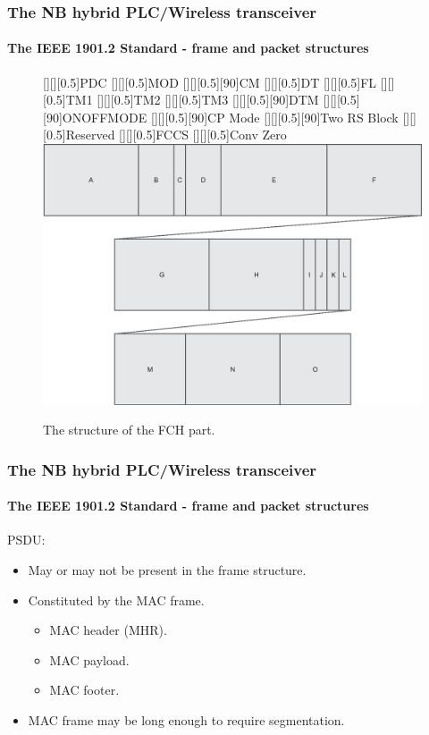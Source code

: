 \documentclass[mathserif]{beamer}
\newcommand{\wait}{\vfill}
\begin{document}
\begin{frame}
	\frametitle{The NB hybrid PLC/Wireless transceiver}
	\framesubtitle{The IEEE 1901.2 Standard - frame and packet structures}
	\renewcommand{\sizeLetter}{0.5}
	\begin{figure}[ht]
		\centering
		[][][\sizeLetter]{PDC}
		[][][\sizeLetter]{MOD}
		[][][\sizeLetter][90]{CM}
		[][][\sizeLetter]{DT}
		[][][\sizeLetter]{FL}
		[][][\sizeLetter]{TM1}
		[][][\sizeLetter]{TM2}
		[][][\sizeLetter]{TM3}
		[][][\sizeLetter][90]{DTM}
		[][][\sizeLetter][90]{ONOFFMODE}
		[][][\sizeLetter][90]{CP Mode}
		[][][\sizeLetter][90]{Two RS Block}
		[][][\sizeLetter]{Reserved}
		[][][\sizeLetter]{FCCS}
		[][][\sizeLetter]{Conv Zero}
		\includegraphics[width=0.75\linewidth]{figuras/FCH}
		\caption{The structure of the FCH part.}
		\label{fig:fch}
	\end{figure}
\end{frame}

\begin{frame}
	\frametitle{The NB hybrid PLC/Wireless transceiver}
	\framesubtitle{The IEEE 1901.2 Standard - frame and packet structures}
	PSDU:
	\begin{itemize}
		\item May or may not be present in the frame structure. \wait
		\item Constituted by the MAC frame.
		\begin{itemize}
			\item MAC header (MHR).
			\item MAC payload.
			\item MAC footer. 
		\end{itemize}
		\item MAC frame may be long enough to require segmentation.
	\end{itemize}
\end{frame}
\end{document}
